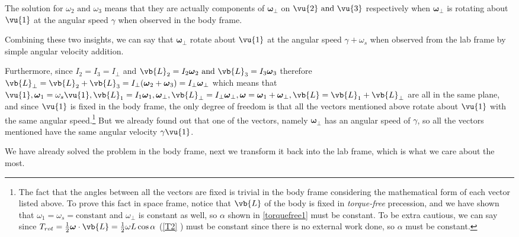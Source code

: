 \documentclass[a4paper,12pt]{report}
\begin{document}
The solution for \(\omega _{2} \text{ and } \omega _{3} \) means that they are actually components of \(\boldsymbol{\omega }  _{\perp } \) on \(\vu{2} \text{ and } \vu{3} \)  respectively when \(\boldsymbol{\omega } _{\perp } \) is rotating about \(\vu{1} \)  at the angular speed \(\gamma \) when observed in the body frame.

Combining these two insights, we can say that \(\boldsymbol{\omega } _{\perp } \) rotate about \(\vu{1} \) at the angular speed \(\gamma + \omega _{s} \) when observed from the lab frame by simple angular velocity addition.

Furthermore, since \(I_2=I_3=I_{\perp } \) and \(\vb{L} _{2} = I_2 \boldsymbol{\omega } _{2} \text{ and } \vb{L} _{3} = I_3 \boldsymbol{\omega } _{3}  \) therefore \(\vb{L} _{\perp } = \vb{L} _{2} +\vb{L} _{3} = I_{\perp } (\boldsymbol{\omega }  _{2} + \boldsymbol{\omega } _{3}) = I_{\perp }  \boldsymbol{\omega } _{\perp } \) which means that \(\vu{1} , \boldsymbol{\omega } _{1} = \omega _{s} \vu{1}, \vb{L} _{1} = I_1\boldsymbol{\omega } _{1} ,  \boldsymbol{\omega } _{\perp } , \vb{L} _{\perp } = I_{\perp } \boldsymbol{\omega } _{\perp }, \boldsymbol{\omega } = \boldsymbol{\omega } _{1} + \boldsymbol{\omega } _{\perp } , \vb{L} = \vb{L} _{1} + \vb{L} _{\perp } \) are all in the same plane, and since \(\vu{1} \) is fixed in the body frame, the only degree of freedom is that all the vectors mentioned above rotate about \(\vu{1} \) with the same angular speed.\footnote{The fact that the angles between all the vectors are fixed is trivial in the body frame considering the mathematical form of each vector listed above. To prove this fact in space frame, notice that \(\vb{L} \) of the body is fixed in \emph{torque-free} precession, and we have shown that \(\omega _{1} = \omega _{s} = \text{constant} \) and \(\omega _{\perp } \) is constant as well, so \(\alpha \) shown in \cref{torquefree1}  must be constant. To be extra cautious, we can say since \(T_{rot} = \frac{1}{2} \boldsymbol{\omega } \cdot \vb{L} = \frac{1}{2} \omega L \cos \alpha  \) (\cref{T2} ) must be constant since there is no external work done, so \(\alpha \) must be constant.  }  But we already found out that one of the vectors, namely  \(\boldsymbol{\omega } _{\perp } \) has an angular speed of \(\gamma \), so all the vectors mentioned have the same angular velocity \(\gamma \vu{1} \). 

We have already solved the problem in the body frame, next we transform it back into the lab frame, which is what we care about the most.
\end{document}

